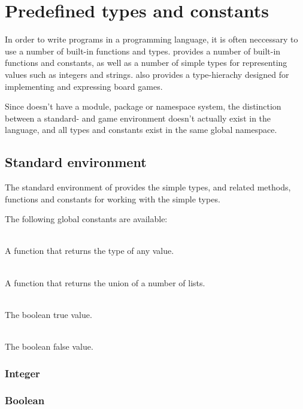 \section{Predefined types and constants}
\label{sec:predefined}

In order to write programs in a programming language, it is often neccessary to use a number of built-in
functions and types. \productname{} provides a number of built-in functions and constants, as well as 
a number of simple types for representing values such as integers and strings. \productname{} also provides
a type-hierachy designed for implementing and expressing board games.

Since \productname{} doesn't have a module, package or namespace system, the distinction between a standard-
and game environment doesn't actually exist in the language, and all types and constants exist in the same
global namespace.

\subsection{Standard environment}
\label{sec:standardenvironment}

The standard environment of \productname{} provides the simple types, and related methods, functions and
constants for working with the simple types.

The following global constants are available:

\begin{dlist}
  \item {}\\
    A function that returns the type of any value.
  \item {}\\
    A function that returns the union of a number of lists.
  \item {}\\
    The boolean true value.
  \item {}\\
    The boolean false value.
\end{dlist}

\subsubsection{Integer}

\subsubsection{Boolean}

